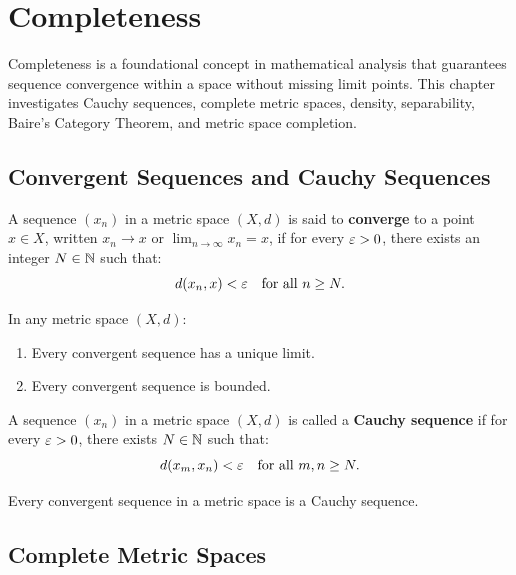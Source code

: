 \chapter{Completeness}
\label{chap:completeness}

Completeness is a foundational concept in mathematical analysis that guarantees sequence convergence within a space without missing limit points. This chapter investigates Cauchy sequences, complete metric spaces, density, separability, Baire's Category Theorem, and metric space completion.

\section{Convergent Sequences and Cauchy Sequences}
\label{sec:sequences_completeness}

\begin{definition}
A sequence $(x_n)$ in a metric space $(X,d)$ is said to \textbf{converge} to a point $x \in X$, written $x_n \to x$ or $\lim_{n \to \infty} x_n = x$, if for every $\varepsilon > 0$, there exists an integer $N \in \mathbb{N}$ such that:
\[
d(x_n, x) < \varepsilon \quad \text{for all } n \ge N.
\]
\end{definition}

\begin{theorem}
In any metric space $(X,d)$:
\begin{enumerate}[label=\rm{(\roman*)}]
    \item Every convergent sequence has a unique limit.
    \item Every convergent sequence is bounded.
\end{enumerate}
\end{theorem}

\begin{definition}
A sequence $(x_n)$ in a metric space $(X,d)$ is called a \textbf{Cauchy sequence} if for every $\varepsilon > 0$, there exists $N \in \mathbb{N}$ such that:
\[
d(x_m, x_n) < \varepsilon \quad \text{for all } m, n \ge N.
\]
\end{definition}

\begin{theorem}
Every convergent sequence in a metric space is a Cauchy sequence.
\end{theorem}


\section{Complete Metric Spaces}
\label{sec:complete_spaces}

